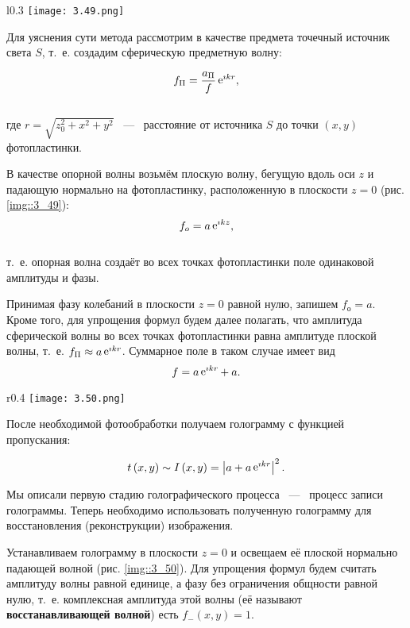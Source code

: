 \begin{wrapfigure}{l}{0.3\linewidth}
  \texttt{[image: 3.49.png]}
  \caption{Запись голограммы точечного источника}
  \label{img::3_49}
\end{wrapfigure}

Для уяснения сути метода рассмотрим в качестве предмета точечный источник света $S$, т.~е. создадим сферическую предметную волну:

$$
f_{\Pi} = \frac{a_{\Pi}}{f} \mathop{\mathrm e}\nolimits^{\imath kr},
$$\\
где $r = \sqrt{z_0^2 + x^2 + y^2}$ ~---~ расстояние от источника $S$ до точки $\left( x, y \right)$ фотопластинки. 

В качестве опорной волны возьмём плоскую волну, бегущую вдоль оси $z$ и падающую нормально на фотопластинку, расположенную в плоскости 
$z = 0$ (рис. \ref{img::3_49}):
$$
f_o = a \mathop{\mathrm e}\nolimits^{\imath kz},
$$\\
т.~е. опорная волна создаёт во всех точках фотопластинки поле одинаковой амплитуды и фазы.

Принимая фазу колебаний в плоскости $z = 0$ равной нулю, запишем $f_о = a$. 
Кроме того, для упрощения формул будем далее полагать, что амплитуда сферической волны во всех точках фотопластинки равна амплитуде плоской волны, 
т.~е. $f_{\Pi} \approx a\mathop{\mathrm e}\nolimits^{\imath kr}$. Суммарное поле в таком случае имеет вид
$$
f = a\mathop{\mathrm e}\nolimits^{\imath kr} + \: a.
$$
\begin{wrapfigure}{r}{0.4\linewidth}
  \texttt{[image: 3.50.png]}
  \caption{Восстановление голограммы точечного источника}
  \label{img::3_50}
\end{wrapfigure}
После необходимой фотообработки получаем голограмму с
функцией пропускания:

\begin{equation}\label{eq::3.83}
t\left(x, y\right) \sim I\left(x, y\right)  = 
\left|a +  a\mathop{\mathrm e}\nolimits^{\imath kr}\right|^2.
\end{equation}

Мы описали первую стадию голографического процесса ~---~ процесс записи голограммы.
Теперь необходимо использовать полученную голограмму для восстановления (реконструкции) изображения.

Устанавливаем голограмму в плоскости $z = 0$ и освещаем её плоской нормально падающей волной (рис. \ref{img::3_50}). Для упрощения формул
будем считать амплитуду волны равной единице, а фазу без ограничения общности равной нулю, т.~е. комплексная амплитуда этой волны (её
называют \textbf{восстанавливающей волной}) есть $f_-(x,y) = 1$.


